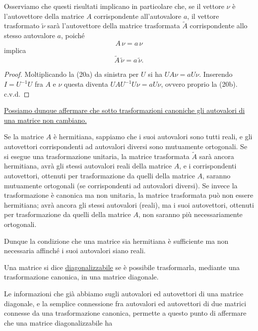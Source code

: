 \documentclass[11pt, a4paper]{book}
\numberwithin{equation}{section}
\begin{document}
Osserviamo che questi risultati implicano in particolare che, se il
vettore $\nu$ è l'autovettore della matrice $A$ corrispondente
all'autovalore $a$, il vettore trasformato $\widetilde{\nu}$ sarà
l'autovettore della matrice trasformata $\widetilde{A}$ corrispondente
allo stesso autovalore $a$, poiché
\begin{equation}
A\,\nu = a\,\nu \tag{20a}
\end{equation}
implica
\begin{equation}
\widetilde{A}\,\widetilde{\nu} = a\,\widetilde{\nu}. \tag{20b}
\end{equation}

\begin{proof}
Moltiplicando la (20a) da sinistra per $U$ si ha $UA\nu = aU\nu$.
Inserendo $I = U^{-1}U$ fra $A$ e $\nu$ questa diventa
$UAU^{-1}U\nu = aU\nu$,
ovvero proprio la (20b). c.v.d.
\end{proof}

\uline{Possiamo dunque affermare che sotto trasformazioni canoniche gli
autovalori di una matrice non cambiano.}

Se la matrice $A$ è hermitiana, sappiamo che i suoi autovalori sono
tutti reali, e gli autovettori corrispondenti ad autovalori diversi sono
mutuamente ortogonali. Se si esegue una trasformazione unitaria, la
matrice trasformata $\widetilde{A}$ sarà ancora hermitiana, avrà gli
stessi autovalori reali della matrice $A$, e i corrispondenti autovettori,
ottenuti per trasformazione da quelli della matrice $A$, saranno
mutuamente ortogonali (se corrispondenti ad autovalori diversi). Se invece
la trasformazione è canonica ma non unitaria, la matrice trasformata può
non essere hermitiana; avrà ancora gli stessi autovalori (reali), ma i
suoi autovettori, ottenuti per trasformazione da quelli della matrice $A$,
non saranno più necessariamente ortogonali.

Dunque la condizione che una matrice sia hermitiana è sufficiente ma non
necessaria affinché i suoi autovalori siano reali.

Una matrice si dice \uline{diagonalizzabile} se è possibile
trasformarla, mediante una trasformazione canonica, in una matrice
diagonale.

Le informazioni che già abbiamo sugli autovalori ed autovettori di una
matrice diagonale, e la semplice connessione fra autovalori ed autovettori
di due matrici connesse da una trasformazione canonica, permette a questo
punto di affermare che una matrice diagonalizzabile ha
\end{document}
